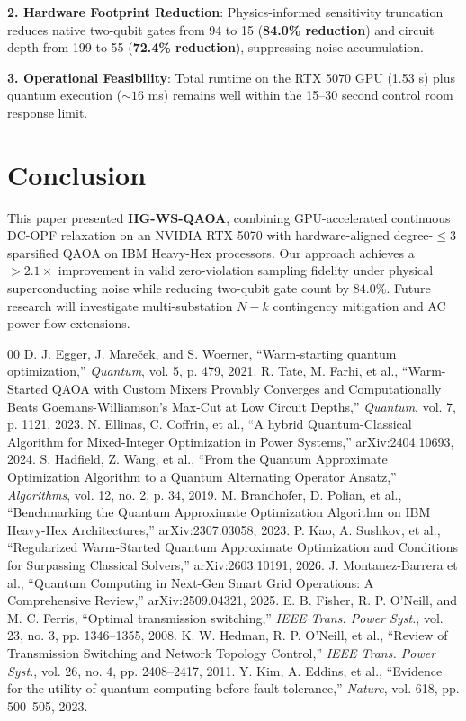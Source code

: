 \documentclass[conference]{IEEEtran}
\begin{document}
\textbf{2. Hardware Footprint Reduction}: Physics-informed sensitivity truncation reduces native two-qubit gates from 94 to 15 (\textbf{84.0\% reduction}) and circuit depth from 199 to 55 (\textbf{72.4\% reduction}), suppressing noise accumulation.

\textbf{3. Operational Feasibility}: Total runtime on the RTX 5070 GPU (1.53 s) plus quantum execution ($\sim 16$ ms) remains well within the 15--30 second control room response limit.

\section{Conclusion}
This paper presented \textbf{HG-WS-QAOA}, combining GPU-accelerated continuous DC-OPF relaxation on an NVIDIA RTX 5070 with hardware-aligned degree-$\le 3$ sparsified QAOA on IBM Heavy-Hex processors. Our approach achieves a $>2.1\times$ improvement in valid zero-violation sampling fidelity under physical superconducting noise while reducing two-qubit gate count by $84.0\%$. Future research will investigate multi-substation $N-k$ contingency mitigation and AC power flow extensions.

\begin{thebibliography}{00}
 D. J. Egger, J. Mare\v{c}ek, and S. Woerner, ``Warm-starting quantum optimization,'' \textit{Quantum}, vol. 5, p. 479, 2021.
 R. Tate, M. Farhi, et al., ``Warm-Started QAOA with Custom Mixers Provably Converges and Computationally Beats Goemans-Williamson's Max-Cut at Low Circuit Depths,'' \textit{Quantum}, vol. 7, p. 1121, 2023.
 N. Ellinas, C. Coffrin, et al., ``A hybrid Quantum-Classical Algorithm for Mixed-Integer Optimization in Power Systems,'' arXiv:2404.10693, 2024.
 S. Hadfield, Z. Wang, et al., ``From the Quantum Approximate Optimization Algorithm to a Quantum Alternating Operator Ansatz,'' \textit{Algorithms}, vol. 12, no. 2, p. 34, 2019.
 M. Brandhofer, D. Polian, et al., ``Benchmarking the Quantum Approximate Optimization Algorithm on IBM Heavy-Hex Architectures,'' arXiv:2307.03058, 2023.
 P. Kao, A. Sushkov, et al., ``Regularized Warm-Started Quantum Approximate Optimization and Conditions for Surpassing Classical Solvers,'' arXiv:2603.10191, 2026.
 J. Montanez-Barrera et al., ``Quantum Computing in Next-Gen Smart Grid Operations: A Comprehensive Review,'' arXiv:2509.04321, 2025.
 E. B. Fisher, R. P. O'Neill, and M. C. Ferris, ``Optimal transmission switching,'' \textit{IEEE Trans. Power Syst.}, vol. 23, no. 3, pp. 1346--1355, 2008.
 K. W. Hedman, R. P. O'Neill, et al., ``Review of Transmission Switching and Network Topology Control,'' \textit{IEEE Trans. Power Syst.}, vol. 26, no. 4, pp. 2408--2417, 2011.
 Y. Kim, A. Eddins, et al., ``Evidence for the utility of quantum computing before fault tolerance,'' \textit{Nature}, vol. 618, pp. 500--505, 2023.
\end{thebibliography}
\end{document}
